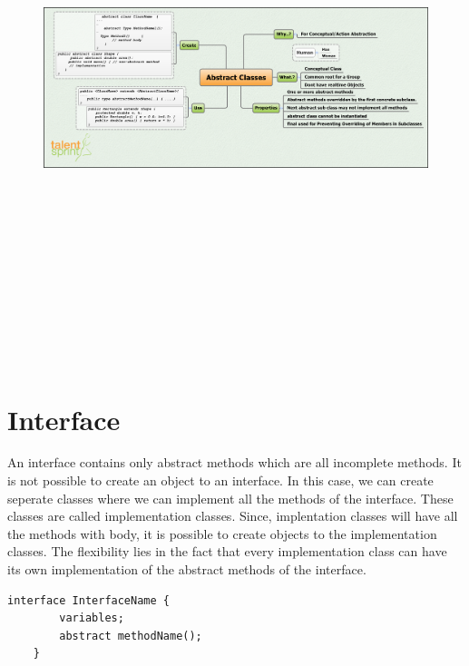\documentclass[11pt,a4paper]{article}
\begin{document}
\begin{figure}[H]
 \begin{center}
   \includegraphics[angle=90,height=16cm, width=13cm]{AbstractClasses.png}
 \end{center}
 \end{figure}

\section*{Interface}
An interface contains only abstract methods which are all incomplete methods. It is not possible to create an object to an interface. In this case, we can create seperate classes where we can implement all the methods of the interface. These classes are called implementation classes. Since, implentation classes will have all the methods with body, it is possible to create objects to the implementation classes. The flexibility lies in the fact that every implementation class can have its own implementation of the abstract methods of the interface. 

\begin{lstlisting}[numbers=none]
    interface InterfaceName {
        variables;
        abstract methodName();
    }
\end{lstlisting}
\end{document}

